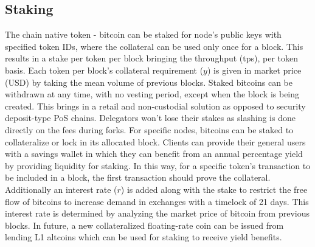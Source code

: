 \documentclass[../Bitcoin Blink.tex]{subfiles}
\begin{document}
\subsection{Staking}
The chain native token - bitcoin can be staked for node's public keys with specified token IDs, where the collateral can be used only once for a block. This results in a stake per token per block bringing the throughput (tps), per token basis. Each token per block's collateral requirement ($y$) is given in market price (USD) by taking the mean volume of previous blocks. Staked bitcoins can be withdrawn at any time, with no vesting period, except when the block is being created. This brings in a retail and non-custodial solution as opposed to security deposit-type PoS chains. Delegators won't lose their stakes as slashing is done directly on the fees during forks. For specific nodes, bitcoins can be staked to collateralize or lock in its allocated block. Clients can provide their general users with a savings wallet in which they can benefit from an annual percentage yield by providing liquidity for staking. In this way, for a specific token's transaction to be included in a block, the first transaction should prove the collateral. Additionally an interest rate ($r$) is added along with the stake to restrict the free flow of bitcoins to increase demand in exchanges with a timelock of 21 days. This interest rate is determined by analyzing the market price of bitcoin from previous blocks. In future, a new collateralized floating-rate coin can be issued from lending L1 altcoins which can be used for staking to receive yield benefits. 
\end{document}

